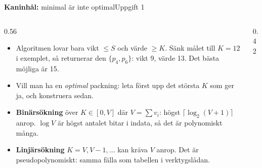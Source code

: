 \documentclass[aspectratio=169,10pt]{beamer}
\newcommand{\rabbit}{\textcolor{warnorange}{\textbf{Kaninhål:}} }
\begin{document}
\begin{frame}{\rabbit minimal är inte optimal}{Uppgift 1}
  \begin{columns}[T]
    \begin{column}{0.56\textwidth}
      \begin{itemize}
        \item<1-> Algoritmen lovar bara vikt $\le S$ och värde $\ge K$. Sänk målet till $K=12$ i exemplet, så returnerar den $\{p_4,p_6\}$: vikt 9, värde 13. Det bästa möjliga är 15.
        \item<2-> Vill man ha en \emph{optimal} packning: leta först upp det största $K$ som ger ja, och konstruera sedan.
        \item<3-> \textbf{Binärsökning} över $K\in[0,V]$ där $V=\sum v_i$: högst $\lceil\log_2(V+1)\rceil$ anrop. $\log V$ är högst antalet bitar i indata, så det är polynomiskt många.
        \item<4-> \textbf{Linjärsökning} $K=V,V-1,\dots$ kan kräva $V$ anrop. Det är pseudopolynomiskt: samma fälla som tabellen i verktygslådan.
      \end{itemize}
    \end{column}
    \begin{column}{0.42\textwidth}
      \centering
    \end{column}
  \end{columns}
\end{frame}
\end{document}

